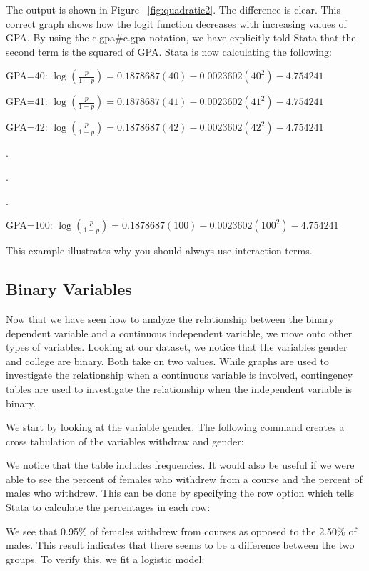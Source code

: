 \documentclass[a4paper,12pt,oneside]{book}
\begin{document}
The output is shown in Figure ~\ref{fig:quadratic2}. The difference is clear. This correct graph shows how the logit function decreases with increasing values of GPA. By using the c.gpa\#c.gpa notation, 
we have explicitly told Stata that the second term is the squared of GPA. Stata is now calculating the following:

GPA=40: $ \log(\frac{p}{1-p})=0.1878687(40)-0.0023602(40^2)-4.754241 $

GPA=41: $ \log(\frac{p}{1-p})=0.1878687(41)-0.0023602(41^2)-4.754241 $

GPA=42: $ \log(\frac{p}{1-p})=0.1878687(42)-0.0023602(42^2)-4.754241 $

.

.

.

GPA=100: $ \log(\frac{p}{1-p})=0.1878687(100)-0.0023602(100^2)-4.754241 $

This example illustrates why you should always use interaction terms.
\subsection{Binary Variables} 
Now that we have seen how to analyze the relationship between the binary dependent variable and a continuous independent variable, we move onto other types of variables. Looking at our dataset, we notice 
that the variables gender and college are binary. Both take on two values. While graphs are used to investigate the relationship when a continuous variable is involved, contingency tables are used to investigate 
the relationship when the independent variable is binary.

We start by looking at the variable gender. The following command creates a cross tabulation of the variables withdraw and gender:

\begin{stlog}\end{stlog}

We notice that the table includes frequencies. It would also be useful if we were able to see the percent of females who withdrew from a course and the percent of males who withdrew. This can be done by 
specifying the row option which tells Stata to calculate the percentages in each row:

\begin{stlog}\end{stlog}

We see that 0.95\% of females withdrew from courses as opposed to the 2.50\% of males. This result indicates that there seems to be a difference between the two groups. To verify this, we fit a logistic model:
\end{document}
